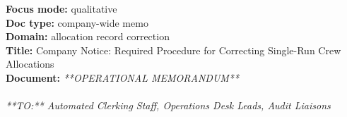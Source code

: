 \begin{exbox}
  \textbf{Focus mode:} qualitative\\
  \textbf{Doc type:} company-wide memo\\
  \textbf{Domain:} allocation record correction\\
  \textbf{Title:} Company Notice: Required Procedure for Correcting Single-Run Crew Allocations\\[3pt]
  \textbf{Document:} \textit{{}**OPERATIONAL MEMORANDUM** \\
  \  \\
  {}**TO:** Automated Clerking Staff, Operations Desk Leads, Audit Liaisons \\
}
\end{exbox}
